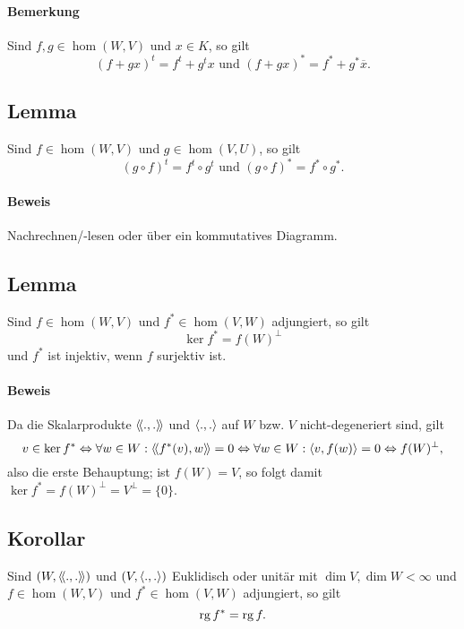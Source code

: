 \paragraph{Bemerkung}
	Sind $ f,g \in \hom(W,V)$ und $ x\in K $, so gilt
		\[ (f+gx)^t = f^t+g^tx \text{ und } (f+gx)^* = f^*+g^*\overline{x}. \]
		
\subsection{Lemma}
\begin{Lemma}
	Sind $ f\in \hom(W,V) $ und $ g\in \hom(V,U) $, so gilt
		\[ (g\circ f)^t = f^t \circ g^t \text{ und } (g\circ f)^* = f^* \circ g^*. \]
\end{Lemma}
\paragraph{Beweis}
	Nachrechnen/-lesen oder über ein kommutatives Diagramm.
     	\begin{figure}[H]\centering
     		
    	\end{figure}


\subsection{Lemma}
	Sind $ f\in \hom(W,V) $ und $ f^*\in \hom(V,W) $ adjungiert, so gilt
		\[ \ker f^* = f(W)^\perp \]
	und $ f^* $ ist injektiv, wenn $ f $ surjektiv ist.
\paragraph{Beweis}
	Da die Skalarprodukte $ \langle\! \langle .,. \rangle\! \rangle $ und $ \langle .,. \rangle $ auf $ W $ bzw. $ V $ nicht-degeneriert sind, gilt
		\[ v\in \ker f^* \Leftrightarrow \forall w\in W: \langle\! \langle f^*(v),w \rangle\! \rangle = 0 \Leftrightarrow \forall w\in W: \langle v,f(w) \rangle = 0\Leftrightarrow f(W)^\perp, \]
	also die erste Behauptung; ist $ f(W)  = V$, so folgt damit $ \ker f^* = f(W)^\perp = V^\perp = \{0\} $.

\subsection{Korollar}
	Sind $ (W,\langle\! \langle .,. \rangle\! \rangle) $ und $ (V,\langle .,. \rangle) $ Euklidisch oder unitär mit $ \dim V, \dim W < \infty $ und $ f\in \hom(W,V) $ und $ f^*\in \hom(V,W) $ adjungiert, so gilt
		\[ \operatorname{rg} f^* = \operatorname{rg} f. \]

